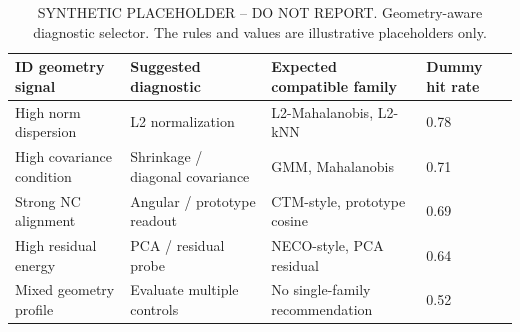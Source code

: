 \begin{table}[t]
\caption{SYNTHETIC PLACEHOLDER -- DO NOT REPORT. Geometry-aware diagnostic
selector. The rules and values are illustrative placeholders only.}
\label{tab:dummy-geometry-selector}
\begin{center}
\footnotesize
\setlength{\tabcolsep}{4pt}
\renewcommand{\arraystretch}{1.15}
\begin{tabular}{@{}p{}p{}p{}p{}@{}}
\toprule
ID geometry signal & Suggested diagnostic & Expected compatible family & Dummy hit rate \\
\midrule
High norm dispersion & L2 normalization & L2-Mahalanobis, L2-kNN & 0.78 \\
High covariance condition & Shrinkage / diagonal covariance & GMM, Mahalanobis & 0.71 \\
Strong NC alignment & Angular / prototype readout & CTM-style, prototype cosine & 0.69 \\
High residual energy & PCA / residual probe & NECO-style, PCA residual & 0.64 \\
Mixed geometry profile & Evaluate multiple controls & No single-family recommendation & 0.52 \\
\bottomrule
\end{tabular}
\end{center}
\end{table}
